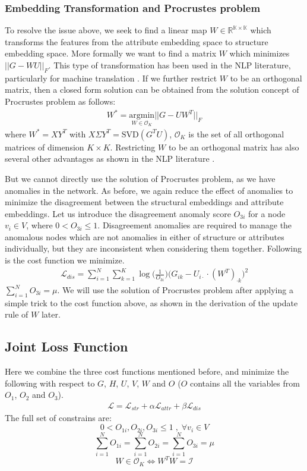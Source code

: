 \documentclass[letterpaper]{article} %
\begin{document}
\subsubsection{Embedding Transformation and Procrustes problem}
To resolve the issue above, we seek to find a linear map $W \in \mathbb{R^{K \times K}}$ which transforms the features from the attribute embedding space to structure embedding space. More formally we want to find a matrix $W$ which minimizes $||G - WU||_F$. This type of transformation has been used in the NLP literature, particularly for machine translation \cite{lample2018word}.
%
If we further restrict $W$ to be an orthogonal matrix, then a closed form solution can be obtained from the solution concept of Procrustes problem \cite{schonemann1966generalized} as follows:
\begin{align}\label{eq:W}
W^* 
= \underset{W \in \mathcal{O}_K}{\text{argmin}} ||G - UW^T||_F
\end{align}
where $W^* = XY^T$ with $X \Sigma Y^T = \text{SVD}(G^T U)$, $\mathcal{O}_K$ is the set of all orthogonal matrices of dimension $K \times K$. Restricting $W$ to be an orthogonal matrix has also several other advantages as shown in the NLP literature \cite{xing2015normalized}.

But we cannot directly use the solution of Procrustes problem, as we have anomalies in the network.
As before, we again reduce the effect of anomalies to minimize the disagreement between the structural embeddings and attribute embeddings. Let us introduce the disagreement anomaly score $O_{3i}$ for a node $v_i \in V$, where $0 < O_{3i} \leq 1$. Disagreement anomalies are required to manage the anomalous nodes which are not anomalies in either of structure or attributes individually, but they are inconsistent when considering them together. Following is the cost function we minimize.
\begin{align}\label{eq:L3}
\mathcal{L}_{dis} = \sum\limits_{i=1}^N \sum\limits_{k=1}^K \log\Big({\frac{1}{O_{3i}}}\Big) \Big(G_{ik} - U_{i\cdot} \cdot (W^T)_{\cdot k}\Big)^2
\end{align}
$\sum\limits_{i=1}^N O_{3i}= \mu$. We will use the solution of Procrustes problem after applying a simple trick to  the cost function above, as shown in the derivation of the update rule of $W$ later.

\subsection{Joint Loss Function}
Here we combine the three cost functions mentioned before, and minimize the following with respect to $G$, $H$, $U$, $V$, $W$ and $O$ ($O$ contains all the variables from $O_1$, $O_2$ and $O_3$).
\begin{align}\label{eq:L}
\mathcal{L} = \mathcal{L}_{str} + \alpha \mathcal{L}_{attr} + \beta \mathcal{L}_{dis}
\end{align}
The full set of constrains are:
\[
0 < O_{1i}, O_{2i}, O_{3i} \leq 1 \; , \; \forall v_i \in V
\]
\[
\sum_{i=1}^{N}O_{1i} = \sum_{i=1}^{N}O_{2i} = \sum_{i=1}^{N}O_{3i} = \mu
\]
\[
W \in \mathcal{O}_{K} \iff W^{T}W = \mathcal{I}
\]
\end{document}
